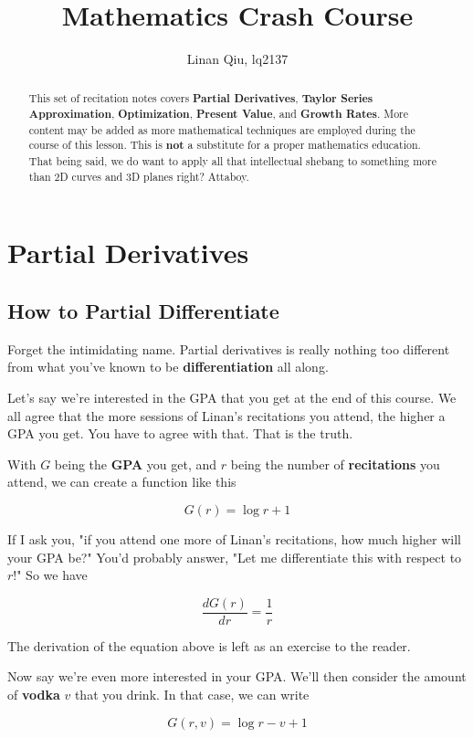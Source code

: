 \documentclass[11pt]{scrartcl}
\title{Mathematics Crash Course}
\author{Linan Qiu, lq2137}
\begin{document}
\maketitle

\begin{abstract}
This set of recitation notes covers \textbf{Partial Derivatives}, \textbf{Taylor Series Approximation}, \textbf{Optimization}, \textbf{Present Value}, and \textbf{Growth Rates}. More content may be added as more mathematical techniques are employed during the course of this lesson. This is \textbf{not} a substitute for a proper mathematics education. That being said, we do want to apply all that intellectual shebang to something more than 2D curves and 3D planes right? Attaboy.
\end{abstract}

\section{Partial Derivatives}

\subsection{How to Partial Differentiate}
Forget the intimidating name. Partial derivatives is really nothing too different from what you've known to be \textbf{differentiation} all along.

Let's say we're interested in the GPA that you get at the end of this course. We all agree that the more sessions of Linan's recitations you attend, the higher a GPA you get. You have to agree with that. That is the truth.

With $G$ being the \textbf{GPA} you get, and $r$ being the number of \textbf{recitations} you attend, we can create a function like this

\[G(r) = \log{r} + 1 \]

If I ask you, "if you attend one more of Linan's recitations, how much higher will your GPA be?" You'd probably answer, "Let me differentiate this with respect to $r$!" So we have

\[ \frac{d G(r)}{d r} = \frac{1}{r} \]

The derivation of the equation above is left as an exercise to the reader. 

Now say we're even more interested in your GPA. We'll then consider the amount of \textbf{vodka} $v$ that you drink. In that case, we can write

\[G(r, v) = \log{r} - v + 1\] 
\end{document}
